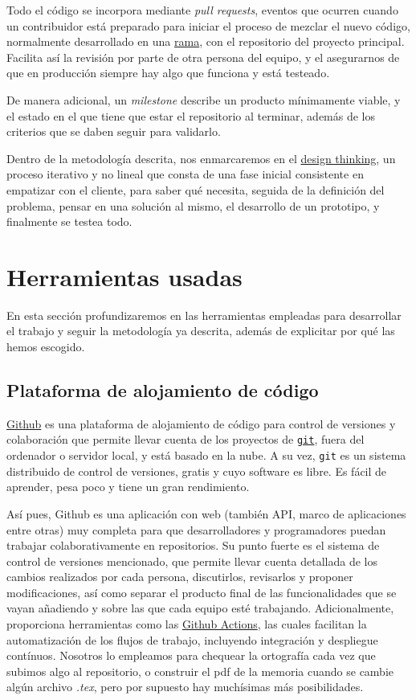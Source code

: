 Todo el código se incorpora mediante \textit{pull requests}, eventos que ocurren cuando un contribuidor está 
preparado para iniciar el proceso de mezclar el nuevo código, normalmente desarrollado en una \href{https://docs.github.com/github/collaborating-with-issues-and-pull-requests/about-branches}{rama}, 
con el repositorio del proyecto principal. Facilita así la revisión por parte de otra persona del equipo, y el 
asegurarnos de que en producción siempre hay algo que funciona y está testeado.

De manera adicional, un \textit{milestone} describe un producto mínimamente viable, y el estado en el que tiene 
que estar el repositorio al terminar, además de los criterios que se daben seguir 
para validarlo.

Dentro de la metodología descrita, nos enmarcaremos en el \href{https://www.iebschool.com/blog/design-thinking-agile-scrum/}{design thinking}, 
un proceso iterativo y no lineal que consta de una fase inicial consistente en empatizar con el 
cliente, para saber qué necesita, seguida de la definición del problema, pensar en una solución al 
mismo, el desarrollo de un prototipo, y finalmente se testea todo. 

\section{Herramientas usadas}
En esta sección profundizaremos en las herramientas empleadas para desarrollar el trabajo y seguir 
la metodología ya descrita, además de explicitar por qué las hemos escogido.

\subsection{Plataforma de alojamiento de código} 

\href{https://github.com/}{Github} es una plataforma de alojamiento de código para control de versiones y 
colaboración que permite llevar cuenta de los proyectos de \href{https://git-scm.com/}{\tt git}, fuera del ordenador o 
servidor local, y está basado en la nube. A su vez, {\tt git} es un 
sistema distribuido de control de versiones, gratis y cuyo software es libre. Es fácil de 
aprender, pesa poco y tiene un gran rendimiento.

Así pues, Github es una aplicación con web (también API, marco de aplicaciones entre otras) muy completa 
para que desarrolladores y programadores puedan trabajar colaborativamente 
en repositorios. Su punto fuerte es el sistema de control de versiones mencionado, que permite llevar 
cuenta detallada 
de los cambios realizados por cada persona, discutirlos, revisarlos y proponer modificaciones, así como 
separar el producto final de las funcionalidades que se vayan añadiendo y sobre las que cada equipo esté 
trabajando. Adicionalmente, proporciona herramientas como las \href{https://github.com/features/actions}{Github Actions}, 
las cuales facilitan la automatización de los flujos de trabajo, incluyendo integración y despliegue contínuos.
Nosotros lo empleamos para chequear la ortografía cada vez que subimos algo al repositorio, o construir el pdf 
de la memoria cuando se cambie algún archivo \textit{.tex}, pero por supuesto hay muchísimas más posibilidades.

